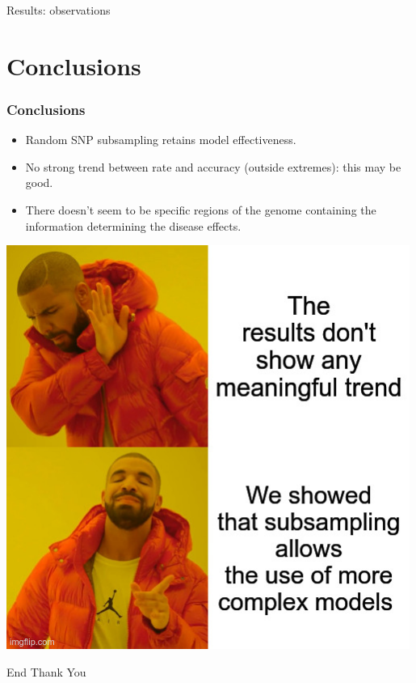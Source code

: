 \documentclass[aspectratio=169]{beamer}
\begin{document}
\begin{frame}{Results: observations}
\end{frame}

\section{Conclusions}
\begin{frame}
\frametitle{Conclusions}
\begin{minipage}{0.60\textwidth}
\begin{itemize}
  \item Random SNP subsampling retains model effectiveness.
  \item No strong trend between rate and accuracy (outside extremes): this may be good.
  \item There doesn't seem to be specific regions of the genome containing the information determining the disease effects.
\end{itemize}
\end{minipage}
\begin{minipage}{0.35\textwidth}
    \includegraphics[width=0.99\textwidth]{memes/drake_results.jpg}
\end{minipage}
\end{frame}

\begin{frame}{End}
\centering
\Huge Thank You
\end{frame}
\end{document}
